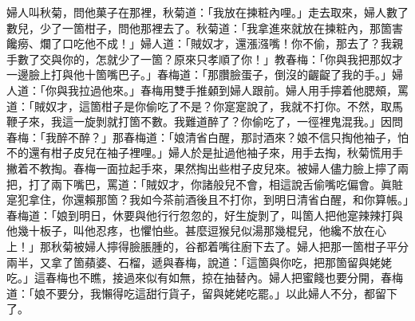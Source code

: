 婦人叫秋菊，問他菓子在那裡，秋菊道：「我放在揀粧內哩。」走去取來，婦人數了數兒，少了一箇柑子，{}問他那裡去了。秋菊道：「我拿進來就放在揀粧內，那箇害饞癆、爛了口吃他不成！」婦人道：「賊奴才，還漲漒嘴！你不偷，那去了？我親手數了交與你的，怎就少了一箇？原來只孝順了你！」教春梅：「你與我把那奴才一邊臉上打與他十箇嘴巴子。」春梅道：「那臢臉蛋子，倒沒的齷齪了我的手。」婦人道：「你與我拉過他來。」春梅用雙手推顙到婦人跟前。婦人用手擰着他腮頰，罵道：「賊奴才，這箇柑子是你偷吃了不是？你寔寔說了，我就不打你。不然，取馬鞭子來，我這一旋剝就打箇不數。我難道醉了？你偷吃了，一徑裡鬼混我。」因問春梅：「我醉不醉？」{}那春梅道：「娘清省白醒，那討酒來？{}娘不信只掏他袖子，怕不的還有柑子皮兒在袖子裡哩。」婦人於是扯過他袖子來，用手去掏，秋菊慌用手撇着不教掏。春梅一面拉起手來，果然掏出些柑子皮兒來。{}被婦人儘力臉上擰了兩把，打了兩下嘴巴，罵道：「賊奴才，你諸般兒不會，相這說舌偷嘴吃偏會。眞賍寔犯拿住，你還賴那箇？我如今茶前酒後且不打你，{}到明日清省白醒，和你算帳。」春梅道：「娘到明日，休要與他行行忽忽的，好生旋剝了，叫箇人把他寔辣辣打與他幾十板子，叫他忍疼，也懼怕些。甚麼逗猴兒似湯那幾棍兒，他纔不放在心上！」那秋菊被婦人擰得臉脹腫的，谷都着嘴往廚下去了。婦人把那一箇柑子平分兩半，又拿了箇蘋婆、石榴，遞與春梅，說道：「這箇與你吃，把那箇留與姥姥吃。」這春梅也不瞧，接過來似有如無，掠在抽替內。婦人把蜜餞也要分開，春梅道：「娘不要分，我懶得吃這甜行貨子，留與姥姥吃罷。」以此婦人不分，都留下了。

